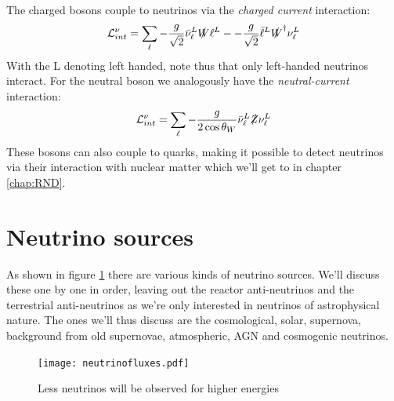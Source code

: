 The charged bosons couple to neutrinos via the \textit{charged current} interaction:
\begin{equation}
	\mathcal{L}_{int}^\nu = \sum_\ell -\frac{g}{\sqrt{2}} \bar{\nu}_\ell^L\slashed{W}\ell^L - -\frac{g}{\sqrt{2}} \bar{\ell}^L\slashed{W}^\dagger\nu_\ell^L
\end{equation}
With the L denoting left handed, note thus that only left-handed neutrinos interact. For the
neutral boson we analogously have the \textit{neutral-current} interaction:
\begin{equation}
	\mathcal{L}_{int}^\nu = \sum_\ell -\frac{g}{2\cos\theta_W} \bar{\nu}_\ell^L\slashed{Z}\nu_\ell^L
\end{equation}
These bosons can also couple to quarks, making it possible to detect neutrinos via their interaction with nuclear matter
which we'll get to in chapter \ref{chap:RND}. 
\section{Neutrino sources}
As shown in figure \ref{figure:Neutrino fluxes} there are various kinds of
neutrino sources. We'll discuss these one by one in order, leaving out the
reactor anti-neutrinos and the terrestrial anti-neutrinos as we're only
interested in neutrinos of astrophysical nature. The ones we'll thus discuss
are the cosmological, solar, supernova, background from old supernovae,
atmospheric, AGN and cosmogenic neutrinos.
\begin{figure}
	\centering
	\texttt{[image: neutrinofluxes.pdf]}
	\caption{Less neutrinos will be observed for higher energies }
	\label{figure:Neutrino fluxes}
\end{figure}
